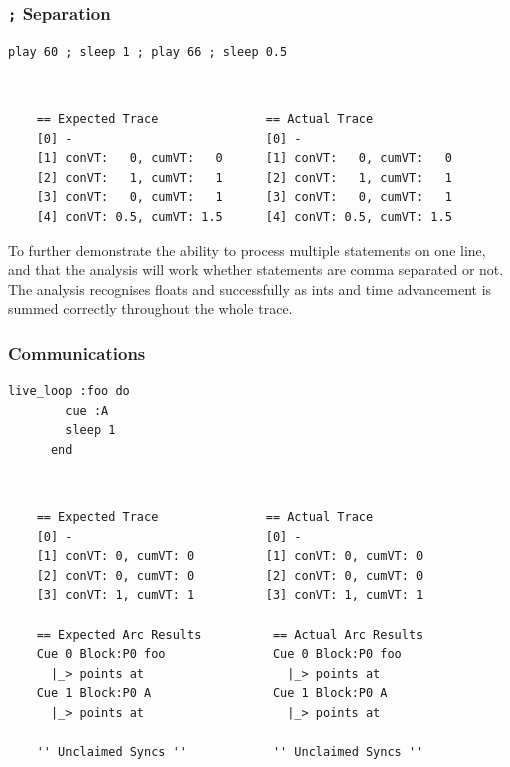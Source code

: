 \documentclass[11pt, abstracton, twoside, titlepage=true]{scrartcl}
\begin{document}
\subsubsection{\texttt{;} Separation}
\begin{minipage}{\textwidth}
	\begin{lstlisting}[style = sonicpi]
      play 60 ; sleep 1 ; play 66 ; sleep 0.5
	\end{lstlisting}
\end{minipage}
\\
\begin{lstlisting}
    == Expected Trace               == Actual Trace
    [0] -                           [0] -
    [1] conVT:   0, cumVT:   0      [1] conVT:   0, cumVT:   0
    [2] conVT:   1, cumVT:   1      [2] conVT:   1, cumVT:   1
    [3] conVT:   0, cumVT:   1      [3] conVT:   0, cumVT:   1
    [4] conVT: 0.5, cumVT: 1.5      [4] conVT: 0.5, cumVT: 1.5
\end{lstlisting}

To further demonstrate the ability to process multiple statements on one line,
and that the analysis will work whether statements are comma separated or not. The
analysis recognises floats and successfully as ints and time advancement is summed
correctly throughout the whole trace.

\subsubsection{Communications}
\begin{minipage}{\textwidth}
	\begin{lstlisting}[style = sonicpi]
      live_loop :foo do
        cue :A
        sleep 1
      end
	\end{lstlisting}
\end{minipage}
\\
\begin{lstlisting}
    == Expected Trace               == Actual Trace
    [0] -                           [0] -
    [1] conVT: 0, cumVT: 0          [1] conVT: 0, cumVT: 0
    [2] conVT: 0, cumVT: 0          [2] conVT: 0, cumVT: 0
    [3] conVT: 1, cumVT: 1          [3] conVT: 1, cumVT: 1

    == Expected Arc Results          == Actual Arc Results 
    Cue 0 Block:P0 foo               Cue 0 Block:P0 foo
      |_> points at                    |_> points at 
    Cue 1 Block:P0 A                 Cue 1 Block:P0 A
      |_> points at                    |_> points at 
    
    '' Unclaimed Syncs ''            '' Unclaimed Syncs '' 
\end{lstlisting}
\end{document}
